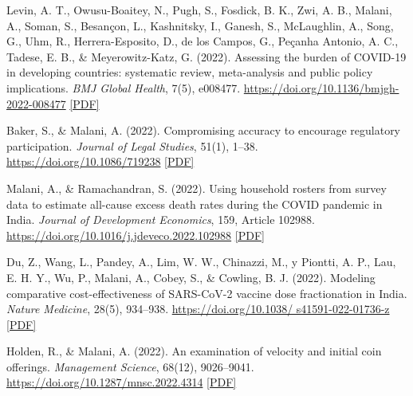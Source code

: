 \begin{tablist}
        \item[2022] \tab{}Levin, A. T., Owusu-Boaitey, N., Pugh, S., Fosdick, B. K., Zwi, A. B., Malani, A., Soman, S., Besançon, L., Kashnitsky, I., Ganesh, S., McLaughlin, A., Song, G., Uhm, R., Herrera-Esposito, D., de los Campos, G., Peçanha Antonio, A. C., Tadese, E. B., \& Meyerowitz-Katz, G. (2022). Assessing the burden of COVID-19 in developing countries: systematic review, meta-analysis and public policy implications. \textit{BMJ Global Health}, 7(5), e008477. \href{https://doi.org/10.1136/bmjgh-2022-008477}{https://doi.org/10.1136/bmjgh-2022-008477} \href{https://github.com/anup-malani/website_personal/blob/main/publications/2022_LevinMalaniEtAl_BMJGlobalHealth_COVIDMortalityDeveloping%20Countries.pdf}{[PDF]} 
        
        \item[2022] \tab{}Baker, S., \& Malani, A. (2022). Compromising accuracy to encourage regulatory participation. \textit{Journal of Legal Studies}, 51(1), 1–38. \href{https://doi.org/10.1086/719238}{https://doi.org/10.1086/719238} \href{https://github.com/anup-malani/website_personal/blob/main/publications/2022_BakerMalani_JLS_CompromisingAccuracy.pdf}{[PDF]}
        
        \item[2022] \tab{}Malani, A., \& Ramachandran, S. (2022). Using household rosters from survey data to estimate all-cause excess death rates during the COVID pandemic in India. \textit{Journal of Development Economics}, 159, Article 102988. \href{https://doi.org/10.1016/j.jdeveco.2022.102988}{https://doi.org/10.1016/j.jdeveco.2022.102988} \href{https://github.com/anup-malani/website_personal/blob/main/publications/2022_MalaniRamachandran_JDE_MortalityCOVID.pdf}{[PDF]}
        
        \item[2022] \tab{}Du, Z., Wang, L., Pandey, A., Lim, W. W., Chinazzi, M., y Piontti, A. P., Lau, E. H. Y., Wu, P., Malani, A., Cobey, S., \& Cowling, B. J. (2022). Modeling comparative cost-effectiveness of SARS-CoV-2 vaccine dose fractionation in India. \textit{Nature Medicine}, 28(5), 934–938. \href{https://doi.org/10.1038/s41591-022-01736-z}{https://doi.org/10.1038/ s41591-022-01736-z} \href{https://github.com/anup-malani/website_personal/blob/main/publications/2022_DuMalaniEtAl_NatureMed_DoseFractionation.pdf}{[PDF]}
        
        \item[2022] \tab{}Holden, R., \& Malani, A. (2022). An examination of velocity and initial coin offerings. \textit{Management Science}, 68(12), 9026–9041. \href{https://doi.org/10.1287/mnsc.2022.4314}{https://doi.org/10.1287/mnsc.2022.4314} \href{https://github.com/anup-malani/website_personal/blob/main/publications/2022_HoldenMalani_ManagementScience_VelocityICO.pdf}{[PDF]}
        

\end{tablist}
